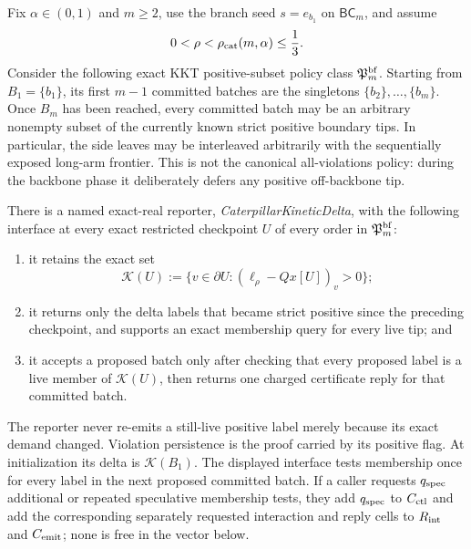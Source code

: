 \begin{theorem}
\label{thm:branch-caterpillar-kinetic-delta-reporter}
Fix $\alpha\in(0,1)$ and $m\geq2$, use the branch seed $s=e_{b_1}$ on
$\mathsf{BC}_m$, and assume
\begin{equation*}
 0<\rho<\rho_{\rm cat}(m,\alpha)\leq\frac13.
\end{equation*}
Consider the following exact KKT positive-subset policy class
$\mathfrak P_m^{\rm bf}$.  Starting from $B_1=\{b_1\}$, its first $m-1$
committed batches are the singletons
$\{b_2\},\ldots,\{b_m\}$.  Once $B_m$ has been reached, every committed batch
may be an arbitrary nonempty subset of the currently known strict positive
boundary tips.  In particular, the side leaves may be interleaved arbitrarily
with the sequentially exposed long-arm frontier.  This is not the canonical
all-violations policy: during the backbone phase it deliberately defers any
positive off-backbone tip.

There is a named exact-real reporter, \emph{CaterpillarKineticDelta}, with the
following interface at every exact restricted checkpoint $U$ of every order in
$\mathfrak P_m^{\rm bf}$:
\begin{enumerate}[label=(\roman*),leftmargin=*]
 \item it retains the exact set
 \begin{equation*}
  \mathcal K(U):=
  \{v\in\partial U:(\ell_\rho-Qx[U])_v>0\};
 \end{equation*}
 \item it returns only the delta labels that became strict positive since the
 preceding checkpoint, and supports an exact membership query for every live
 tip; and
 \item it accepts a proposed batch only after checking that every proposed
 label is a live member of $\mathcal K(U)$, then returns one charged
 certificate reply for that committed batch.
\end{enumerate}
The reporter never re-emits a still-live positive label merely because its
exact demand changed.  Violation persistence is the proof carried by its
positive flag.  At initialization its delta is $\mathcal K(B_1)$.  The
displayed interface tests membership once for every label in the next
proposed committed batch.  If a caller requests $q_{\rm spec}$ additional or
repeated speculative membership tests, they add $q_{\rm spec}$ to
$C_{\rm ctl}$ and add the corresponding separately requested interaction and
reply cells to $R_{\rm int}$ and $C_{\rm emit}$; none is free in the vector
below.


\end{theorem}
